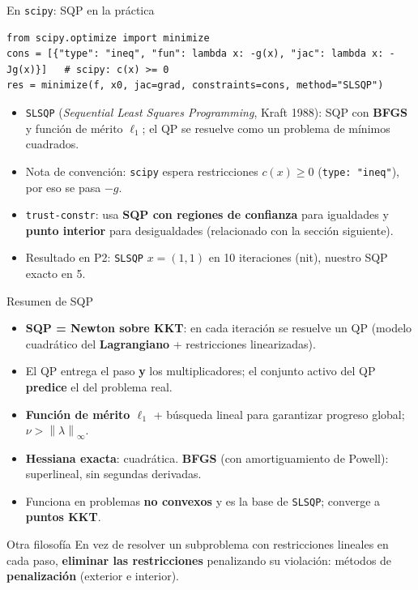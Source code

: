 \documentclass[aspectratio=169]{beamer}
\newcommand{\norm}[1]{\left\lVert #1\right\rVert}
\begin{document}
\begin{frame}[fragile]{En \texttt{scipy}: SQP en la práctica}
\begin{lstlisting}
from scipy.optimize import minimize
cons = [{"type": "ineq", "fun": lambda x: -g(x), "jac": lambda x: -Jg(x)}]   # scipy: c(x) >= 0
res = minimize(f, x0, jac=grad, constraints=cons, method="SLSQP")
\end{lstlisting}
  \small
  \begin{itemize}
    \item \texttt{SLSQP} (\emph{Sequential Least Squares Programming}, Kraft 1988): SQP con \textbf{BFGS} y función de mérito $\ell_1$; el QP se resuelve como un problema de mínimos cuadrados.
    \item Nota de convención: \texttt{scipy} espera restricciones \textbf{$c(x)\ge0$} (\texttt{type: "ineq"}), por eso se pasa $-g$.
    \item \texttt{trust-constr}: usa \textbf{SQP con regiones de confianza} para igualdades y \textbf{punto interior} para desigualdades (relacionado con la sección siguiente).
    \item Resultado en P2: \texttt{SLSQP} $x=(1,1)$ en 10 iteraciones (nit), nuestro SQP exacto en 5.
  \end{itemize}
\end{frame}

\begin{frame}{Resumen de SQP}
  \begin{itemize}
    \item \textbf{SQP = Newton sobre KKT}: en cada iteración se resuelve un QP (modelo cuadrático del \textbf{Lagrangiano} + restricciones linearizadas).
    \item El QP entrega el paso \textbf{y} los multiplicadores; el conjunto activo del QP \textbf{predice} el del problema real.
    \item \textbf{Función de mérito $\ell_1$} + búsqueda lineal para garantizar progreso global; $\nu>\norm{\lambda}_\infty$.
    \item \textbf{Hessiana exacta}: cuadrática. \textbf{BFGS} (con amortiguamiento de Powell): superlineal, sin segundas derivadas.
    \item Funciona en problemas \textbf{no convexos} y es la base de \texttt{SLSQP}; converge a \textbf{puntos KKT}.
  \end{itemize}
  \begin{alertblock}{Otra filosofía}
    En vez de resolver un subproblema con restricciones lineales en cada paso, \textbf{eliminar las restricciones} penalizando su violación: métodos de \textbf{penalización} (exterior e interior).
  \end{alertblock}
\end{frame}
\end{document}
